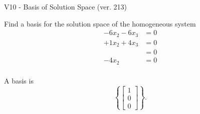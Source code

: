 \begin{exercise}
  \begin{exerciseTitle}V10 - Basis of Solution Space (ver. 213)\end{exerciseTitle}
  \begin{exerciseStatement}
    Find a basis for the solution space of the homogeneous system 
\begin{align*}
 -6 x_ 2 -6 x_ 3 &= 0  \\ 
  + 1 x_ 2 + 4 x_ 3 &= 0  \\ 
  &= 0  \\ 
  -4 x_ 2 &= 0  \\ 
 \end{align*}


 
  \end{exerciseStatement}

  \begin{exerciseAnswer}
   A basis is   
\[\left\{\left[\begin{array}{c}
1 \\
0 \\
0
\end{array}\right]\right\}.\]

  


  \end{exerciseAnswer}
\end{exercise}